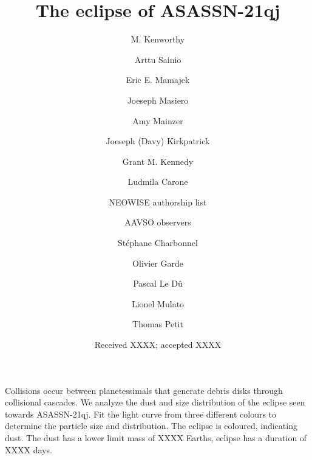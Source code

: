 \documentclass{aa}
\begin{document}
 

   \title{The eclipse of ASASSN-21qj}

   \author{M. Kenworthy
          \and
          Arttu Sainio
          \and
          Eric E. Mamajek
          \and
          Joeseph Masiero
          \and 
          Amy Mainzer
          \and
          Joeseph (Davy) Kirkpatrick
          \and 
          Grant M. Kennedy
          \and
          Ludmila Carone
          \and
          NEOWISE authorship list
          \and
          AAVSO observers
          \and
          St\'{e}phane Charbonnel
          \and
        Olivier Garde
        \and
        Pascal Le D\^{u}
        \and
        Lionel Mulato
        \and
        Thomas Petit
          }

   \date{Received XXXX; accepted XXXX}

 
  \abstract
   {Collisions occur between planetessimals that generate debris disks through collisional cascades.}
   {We analyze the dust and size distribution of the eclipse seen towards ASASSN-21qj.}
   {Fit the light curve from three different colours to determine the particle size and distribution.}
   {The eclipse is coloured, indicating dust.
   The dust has a lower limit mass of XXXX Earths, eclipse has a duration of XXXX days.}
   {}


   \maketitle
%
\end{document}
